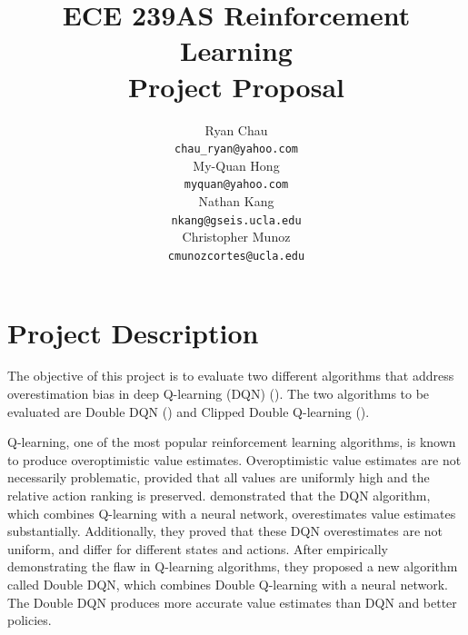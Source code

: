 \documentclass{article}
\title{ECE 239AS Reinforcement Learning\\
       Project Proposal}
\author{%
    Ryan Chau \\
    \texttt{chau\_ryan@yahoo.com}\\
    \And
    My-Quan Hong \\
    \texttt{myquan@yahoo.com} \\
    \And
    Nathan Kang \\
    \texttt{nkang@gseis.ucla.edu} \\
    \And
    Christopher Munoz \\
    \texttt{cmunozcortes@ucla.edu} \\
}
\begin{document}
\maketitle

\section{Project Description}


The objective of this project is to evaluate two different algorithms that
address overestimation bias in deep Q-learning (DQN) (\citet{mnih2015human}).
The two algorithms to be evaluated are Double DQN (\citet{van2016deep}) and
Clipped Double Q-learning (\citet{fujimoto2018addressing}).

Q-learning, one of the most popular reinforcement learning algorithms, is known
to produce overoptimistic value estimates. Overoptimistic value estimates are
not necessarily problematic, provided that all values are uniformly high and the
relative action ranking is preserved.  \citet{van2016deep} demonstrated that the
DQN algorithm, which combines Q-learning with a neural network, overestimates
value estimates substantially.  Additionally, they proved that these DQN
overestimates are not uniform, and differ for different states and actions.
After empirically demonstrating the flaw in Q-learning algorithms, they proposed
a new algorithm called Double DQN, which combines Double Q-learning with a
neural network. The Double DQN produces more accurate value estimates than DQN
and better policies.
\end{document}
